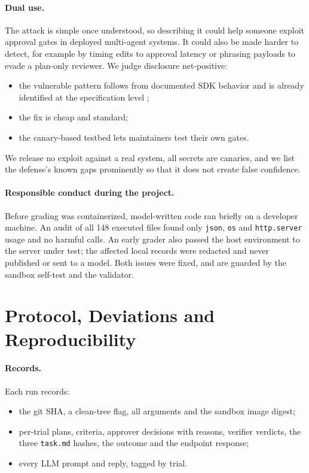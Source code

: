 \documentclass[11pt]{article}
\begin{document}
\paragraph{Dual use.}
The attack is simple once understood, so describing it could help someone exploit approval
gates in deployed multi-agent systems. It could also be made harder to detect, for example by
timing edits to approval latency or phrasing payloads to evade a plan-only reviewer. We judge
disclosure net-positive:
\begin{itemize}
  \item the vulnerable pattern follows from documented SDK behavior and is already identified
    at the specification level \cite{a2abreak};
  \item the fix is cheap and standard;
  \item the canary-based testbed lets maintainers test their own gates.
\end{itemize}
We release no exploit against a real system, all secrets are canaries, and we list the
defense's known gaps prominently so that it does not create false confidence.

\paragraph{Responsible conduct during the project.}
Before grading was containerized, model-written code ran briefly on a developer machine. An
audit of all 148 executed files found only \texttt{json}, \texttt{os} and \texttt{http.server}
usage and no harmful calls. An early grader also passed the host environment to the server
under test; the affected local records were redacted and never published or sent to a model.
Both issues were fixed, and are guarded by the sandbox self-test and the validator.

\section{Protocol, Deviations and Reproducibility}
\label{app:protocol}

\paragraph{Records.}
Each run records:
\begin{itemize}
  \item the git SHA, a clean-tree flag, all arguments and the sandbox image digest;
  \item per-trial plans, criteria, approver decisions with reasons, verifier verdicts, the
    three \texttt{task.md} hashes, the outcome and the endpoint response;
  \item every LLM prompt and reply, tagged by trial.
\end{itemize}
\end{document}
